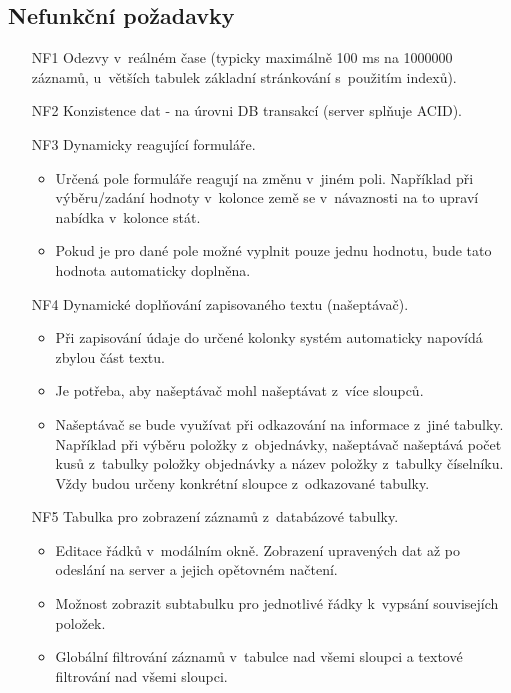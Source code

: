\documentclass[thesis=B,czech]{FITthesis}[2012/06/26]
\begin{document}
\subsection{Nefunkční požadavky}
\begin{enumerate}
	\item[NF1] Odezvy v~reálném čase (typicky maximálně 100 ms na 1000000 záznamů, u~větších tabulek základní stránkování s~použitím indexů).
	\item[NF2] Konzistence dat - na úrovni DB transakcí (server splňuje ACID).
	\item[NF3] Dynamicky reagující formuláře.
	\begin{itemize}
		\item Určená pole formuláře reagují na změnu v~jiném poli. Například při výběru/zadání hodnoty v~kolonce země se v~návaznosti na to upraví nabídka v~kolonce stát. 
		\item Pokud je pro dané pole možné vyplnit pouze jednu hodnotu, bude tato hodnota automaticky doplněna.
	\end{itemize}
	\item[NF4] Dynamické doplňování zapisovaného textu (našeptávač).
	\begin{itemize}
		\item Při zapisování údaje do určené kolonky systém automaticky napovídá zbylou část textu.
		\item Je potřeba, aby našeptávač mohl našeptávat z~více sloupců.
		\item Našeptávač se bude využívat při odkazování na informace z~jiné tabulky. Například při výběru položky z~objednávky, našeptávač našeptává počet kusů z~tabulky položky objednávky a název položky z~tabulky číselníku. Vždy budou určeny konkrétní sloupce z~odkazované tabulky.
	\end{itemize}
	\item[NF5] Tabulka pro zobrazení záznamů z~databázové tabulky.
	\begin{itemize}
		\item Editace řádků v~modálním okně. Zobrazení upravených dat až po odeslání na server a jejich opětovném načtení.
		\item Možnost zobrazit subtabulku pro jednotlivé řádky k~vypsání souvisejích položek.
		\item Globální filtrování záznamů v~tabulce nad všemi sloupci a textové filtrování nad všemi sloupci.
	\end{itemize}
\end{enumerate}
\end{document}
